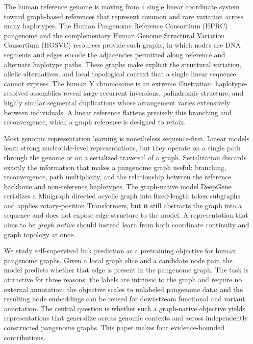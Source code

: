 \IfFileExists{ws-procs11x85.cls}{\worldscientificclasstrue\documentclass{ws-procs11x85}}{\worldscientificclassfalse\documentclass[11pt]{article}\usepackage[margin=1in]{geometry}}
\begin{document}
The human reference genome is moving from a single linear coordinate system
toward graph-based references that represent common and rare variation across
many haplotypes. The Human Pangenome Reference Consortium (HPRC) pangenome and
the complementary Human Genome Structural Variation Consortium (HGSVC)
resources provide such graphs, in which nodes are DNA segments and edges encode
the adjacencies permitted along reference and alternate haplotype
paths.\cite{liao2023hprc,ebert2021hgsvc,garrison2018vg} These graphs make
explicit the structural variation, allelic alternatives, and local topological
context that a single linear sequence cannot express. The human Y chromosome is
an extreme illustration: haplotype-resolved assemblies reveal large recurrent
inversions, palindromic structure, and highly similar segmental duplications whose
arrangement varies extensively between individuals.\cite{hallast2023ychrom} A
linear reference flattens precisely this branching and reconvergence, which a
graph reference is designed to retain.

Most genomic representation learning is nonetheless sequence-first. Linear
models learn strong nucleotide-level representations, but they operate on a
single path through the genome or on a serialized traversal of a
graph.\cite{ji2021dnabert,zhou2024dnabert2,dallatorre2025nt} Serialization
discards exactly the information that makes a pangenome graph useful: branching,
reconvergence, path multiplicity, and the relationship between the reference
backbone and non-reference haplotypes. The graph-native model DeepGene
serializes a Minigraph directed acyclic graph into fixed-length token subgraphs
and applies rotary-position Transformers, but it still abstracts the graph into
a sequence and does not expose edge structure to the
model.\cite{zhang2025deepgene} A representation that aims to be \emph{graph
native} should instead learn from both coordinate continuity and graph topology
at once.

We study self-supervised link prediction as a pretraining objective for human
pangenome graphs. Given a local graph slice and a candidate node pair, the model
predicts whether that edge is present in the pangenome graph. The task is
attractive for three reasons: the labels are intrinsic to the graph and require
no external annotation; the objective scales to unlabeled pangenome data; and
the resulting node embeddings can be reused for downstream functional and
variant annotation. The central question is whether such a graph-native
objective yields representations that generalize across genomic contexts and
across independently constructed pangenome graphs. This paper makes four evidence-bounded
contributions.
\end{document}
